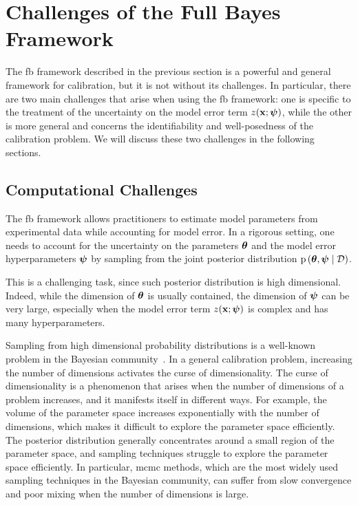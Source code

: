 \section{Challenges of the Full Bayes Framework}
\label{sec:sota_1:identifiability}

The \gls{fb} framework described in the previous section is a powerful and general framework for calibration, but it is not without its challenges. In particular, there are two main challenges that arise when using the \gls{fb} framework: one is specific to the treatment of the uncertainty on the model error term $z(\mathbf{x}; \boldsymbol{\psi})$, while the other is more general and concerns the identifiability and well-posedness of the calibration problem. We will discuss these two challenges in the following sections.

\subsection{Computational Challenges}

The \gls{fb} framework allows practitioners to estimate model parameters from experimental data while accounting for model error. In a rigorous setting, one needs to account for the uncertainty on the parameters $\boldsymbol{\theta}$ and the model error hyperparameters $\boldsymbol{\psi}$ by sampling from the joint posterior distribution $\mathrm{p} \left( \boldsymbol{\theta}, \boldsymbol{\psi} \mid \mathcal{D} \right)$. 

\smallskip
This is a challenging task, since such posterior distribution is high dimensional. Indeed, while the dimension of $\boldsymbol{\theta}$ is usually contained, the dimension of $\boldsymbol{\psi}$ can be very large, especially when the model error term $z(\mathbf{x}; \boldsymbol{\psi})$ is complex and has many hyperparameters. 

\smallskip
Sampling from high dimensional probability distributions is a well-known problem in the Bayesian community~\cite{fmp, uq_theory}. In a general calibration problem, increasing the number of dimensions activates the curse of dimensionality. The curse of dimensionality is a phenomenon that arises when the number of dimensions of a problem increases, and it manifests itself in different ways. For example, the volume of the parameter space increases exponentially with the number of dimensions, which makes it difficult to explore the parameter space efficiently. The posterior distribution generally concentrates around a small region of the parameter space, and sampling techniques struggle to explore the parameter space efficiently. In particular, \gls{mcmc} methods, which are the most widely used sampling techniques in the Bayesian community, can suffer from slow convergence and poor mixing when the number of dimensions is large.

